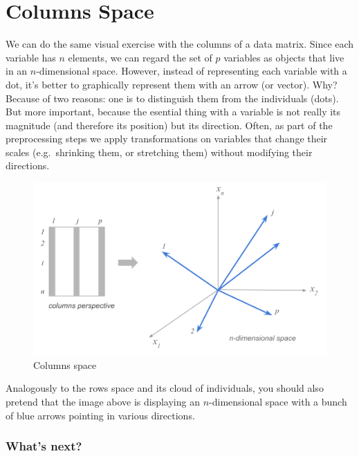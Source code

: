 \documentclass[]{book}
\begin{document}
\hypertarget{columns-space}{%
\section{Columns Space}\label{columns-space}}

We can do the same visual exercise with the columns of a data matrix. Since each variable has \(n\) elements, we can regard the set of \(p\) variables as objects that live in an \(n\)-dimensional space. However, instead of representing each variable with a dot, it's better to graphically represent them with an arrow (or vector). Why? Because of two reasons: one is to distinguish them from the individuals (dots). But more important, because the esential thing with a variable is not really its magnitude (and therefore its position) but its direction. Often, as part of the preprocessing steps we apply transformations on variables that change their scales (e.g.~shrinking them, or stretching them) without modifying their directions.

\begin{figure}

{\centering \includegraphics[width=0.85\linewidth]{images/duality/columns-space} 

}

\caption{Columns space}\label{fig:unnamed-chunk-9}
\end{figure}

Analogously to the rows space and its cloud of individuals, you should also
pretend that the image above is displaying an \(n\)-dimensional space with
a bunch of blue arrows pointing in various directions.

\hypertarget{whats-next}{%
\subsubsection*{What's next?}\label{whats-next}}
\end{document}
